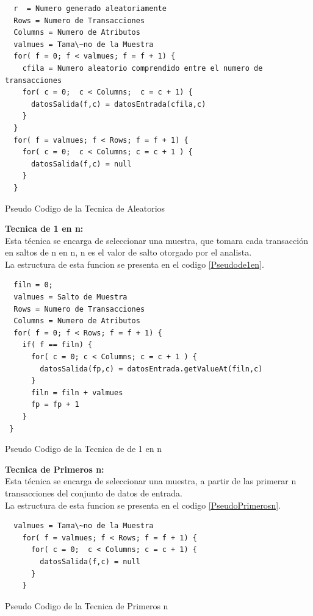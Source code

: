 \begin{codigof}
\begin{verbatim} 
  r  = Numero generado aleatoriamente
  Rows = Numero de Transacciones
  Columns = Numero de Atributos
  valmues = Tama\~no de la Muestra
  for( f = 0; f < valmues; f = f + 1) { 
    cfila = Numero aleatorio comprendido entre el numero de transacciones
    for( c = 0;  c < Columns;  c = c + 1) { 
      datosSalida(f,c) = datosEntrada(cfila,c) 
    }
  }  
  for( f = valmues; f < Rows; f = f + 1) { 
    for( c = 0;  c < Columns; c = c + 1 ) {
      datosSalida(f,c) = null
    }
  }
\end{verbatim}
\caption{Pseudo Codigo de la Tecnica de Aleatorios}
\label{PseudoAleatorios}
\end{codigof} 
      
\textbf{Tecnica de 1 en n:} \\ 
Esta t\'ecnica se encarga de seleccionar una muestra, que tomara cada transacci\'on en saltos de n en n, n es el valor de salto otorgado por el analista.\\
La estructura de esta funcion se presenta en el codigo \ref{Pseudode1en}. \\
         
\begin{codigof}
\begin{verbatim}	 
  filn = 0;
  valmues = Salto de Muestra
  Rows = Numero de Transacciones
  Columns = Numero de Atributos
  for( f = 0; f < Rows; f = f + 1) {
    if( f == filn) {
      for( c = 0; c < Columns; c = c + 1 ) { 
        datosSalida(fp,c) = datosEntrada.getValueAt(filn,c)
      }
      filn = filn + valmues
      fp = fp + 1
    }
 }
\end{verbatim}
\caption{Pseudo Codigo de la Tecnica de de 1 en n}
\label{Pseudode1en}
\end{codigof}

\textbf{Tecnica de Primeros n:} \\
Esta t\'ecnica se encarga de seleccionar una muestra, a partir de las primerar n transacciones del conjunto de datos de entrada.\\
La estructura de esta funcion se presenta en el codigo \ref{PseudoPrimerosn}. 
         
\begin{codigof}
\begin{verbatim}  
  valmues = Tama\~no de la Muestra
    for( f = valmues; f < Rows; f = f + 1) {  
      for( c = 0;  c < Columns; c = c + 1) {
        datosSalida(f,c) = null
      }
    }
\end{verbatim}
\caption{Pseudo Codigo de la Tecnica de Primeros n}
\label{PseudoPrimerosn}
\end{codigof}

